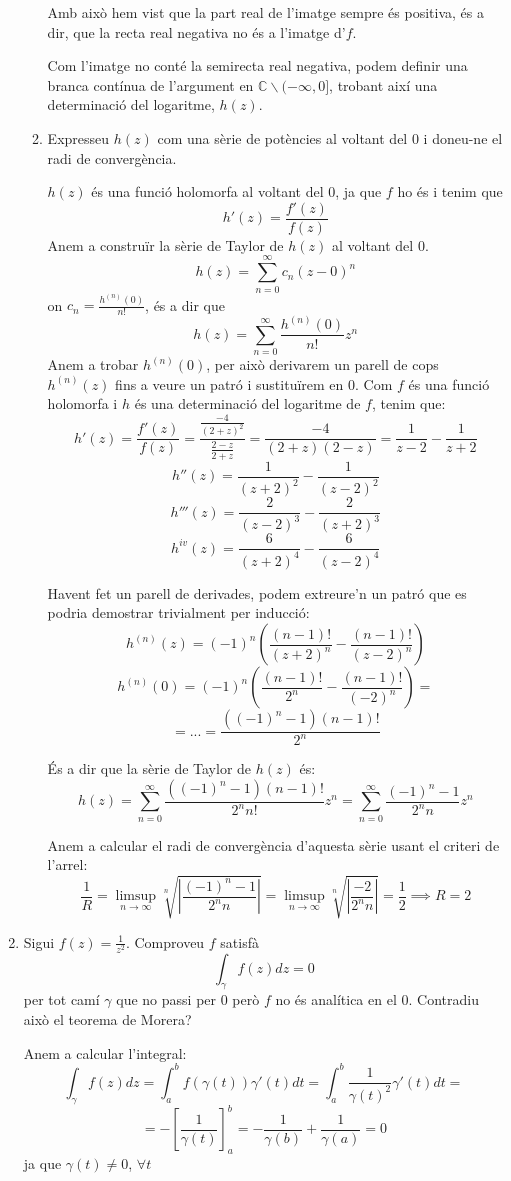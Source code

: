\documentclass[10pt,a4paper]{article}
\begin{document}
\begin{enumerate}
\begin{enumerate}
\begin{framed}
	Amb això hem vist que la part real de l'imatge sempre és positiva, és a dir, que la recta real negativa no és a l'imatge d'$f$.
	
	Com l'imatge no conté la semirecta real negativa, podem definir una branca contínua de l'argument en $\mathbb{C} \backslash (-\infty,0]$, trobant així una determinació del logaritme, $h(z)$.
	\end{framed}
	\item Expresseu $h(z)$ com una sèrie de potències al voltant del 0 i doneu-ne el radi de convergència.
	\begin{framed}
	$h(z)$ és una funció holomorfa al voltant del 0, ja que $f$ ho és i tenim que
	$$h'(z) = \frac{f'(z)}{f(z)}$$
	Anem a construïr la sèrie de Taylor de $h(z)$ al voltant del 0.
	$$h(z) = \sum_{n=0}^{\infty}c_{n}(z-0)^{n}$$
	on $c_{n} = \frac{h^{(n)}(0)}{n!}$, és a dir que
	$$h(z) = \sum_{n=0}^{\infty}\frac{h^{(n)}(0)}{n!}z^{n}$$
	Anem a trobar $h^{(n)}(0)$, per això derivarem un parell de cops $h^{(n)}(z)$ fins a veure un patró i sustituïrem en 0.
	Com $f$ és una funció holomorfa i $h$ és una determinació del logaritme de $f$, tenim que:
	$$h'(z) = \frac{f'(z)}{f(z)} = \frac{\frac{-4}{(2+z)^{2}}}{\frac{2-z}{2+z}}
	= \frac{-4}{(2+z)(2-z)} = \frac{1}{z-2} - \frac{1}{z+2}$$
	$$h''(z) = \frac{1}{(z+2)^{2}} - \frac{1}{(z-2)^{2}}$$
	$$h'''(z) = \frac{2}{(z-2)^{3}} - \frac{2}{(z+2)^{3}}$$
	$$h^{iv}(z) = \frac{6}{(z+2)^{4}} - \frac{6}{(z-2)^{4}}$$
	
	Havent fet un parell de derivades, podem extreure'n un patró que es podria demostrar trivialment per inducció:
	$$h^{(n)}(z) = (-1)^{n}\left(\frac{(n-1)!}{(z+2)^{n}} - \frac{(n-1)!}{(z-2)^{n}}\right)$$
	$$h^{(n)}(0) = (-1)^{n}\left(\frac{(n-1)!}{2^{n}} - \frac{(n-1)!}{(-2)^{n}}\right) =$$
	$$ = ... = \frac{((-1)^{n}-1)(n-1)!}{2^{n}}$$
	
	És a dir que la sèrie de Taylor de $h(z)$ és:
	$$h(z) = \sum_{n=0}^{\infty}\frac{((-1)^{n}-1)(n-1)!}{2^{n}n!}z^{n}
	= \sum_{n=0}^{\infty}\frac{(-1)^{n}-1}{2^{n}n}z^{n}$$
	
	Anem a calcular el radi de convergència d'aquesta sèrie usant el criteri de l'arrel:
	$$\frac{1}{R} = \limsup_{n\rightarrow\infty}\sqrt[n]{\left|\frac{(-1)^{n}-1}{2^{n}n}\right|} = \limsup_{n\rightarrow\infty}\sqrt[n]{\left|\frac{-2}{2^{n}n}\right|} = \frac{1}{2} \implies R=2$$
	\end{framed}	 
	\end{enumerate}
\item Sigui $f(z)=\frac{1}{z^{2}}$. Comproveu $f$ satisfà
$$ \int_{\gamma}f(z)dz = 0 $$
per tot camí $\gamma$ que no passi per 0 però $f$ no és analítica en el 0. Contradiu això el teorema de Morera?
\begin{framed}
Anem a calcular l'integral:
$$ \int_{\gamma}f(z)dz = \int_{a}^{b} f(\gamma(t))\gamma'(t)dt = \int_{a}^{b}\frac{1}{\gamma(t)^{2}}\gamma'(t)dt =$$ 
$$= -\left[\frac{1}{\gamma(t)}\right]_{a}^{b} =
-\frac{1}{\gamma(b)} + \frac{1}{\gamma(a)} = 0$$
ja que $\gamma(t)\neq 0$, $\forall t$


\end{framed}
\end{enumerate}
\end{document}
